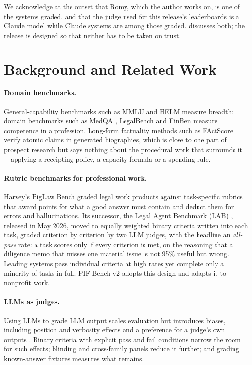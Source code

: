 \documentclass[11pt,a4paper]{article}
\newcommand{\romy}{R\={o}my}
\begin{document}
We acknowledge at the outset that \romy, which the author works on, is one of the systems graded, and that the judge used for this release's leaderboards is a Claude model while Claude systems are among those graded.  discusses both; the release is designed so that neither has to be taken on trust.

\section{Background and Related Work}
\label{sec:related}

\paragraph{Domain benchmarks.} General-capability benchmarks such as MMLU \citep{hendrycks2021measuring} and HELM \citep{liang2023holistic} measure breadth; domain benchmarks such as MedQA \citep{jin2021disease}, LegalBench \citep{guha2024legalbench} and FinBen \citep{xie2024finben} measure competence in a profession. Long-form factuality methods such as FActScore \citep{min2023factscore} verify atomic claims in generated biographies, which is close to one part of prospect research but says nothing about the procedural work that surrounds it---applying a receipting policy, a capacity formula or a spending rule.

\paragraph{Rubric benchmarks for professional work.} Harvey's BigLaw Bench \citep{harvey2024biglaw} graded legal work products against task-specific rubrics that award points for what a good answer must contain and deduct them for errors and hallucinations. Its successor, the Legal Agent Benchmark (LAB) \citep{harvey2026lab}, released in May 2026, moved to equally weighted binary criteria written into each task, graded criterion by criterion by two LLM judges, with the headline an \emph{all-pass} rate: a task scores only if every criterion is met, on the reasoning that a diligence memo that misses one material issue is not 95\% useful but wrong. Leading systems pass individual criteria at high rates yet complete only a minority of tasks in full. PIF-Bench v2 adopts this design and adapts it to nonprofit work.

\paragraph{LLMs as judges.} Using LLMs to grade LLM output scales evaluation but introduces biases, including position and verbosity effects and a preference for a judge's own outputs \citep{zheng2023judging,panickssery2024llm}. Binary criteria with explicit pass and fail conditions narrow the room for such effects; blinding and cross-family panels reduce it further; and grading known-answer fixtures measures what remains.
\end{document}

